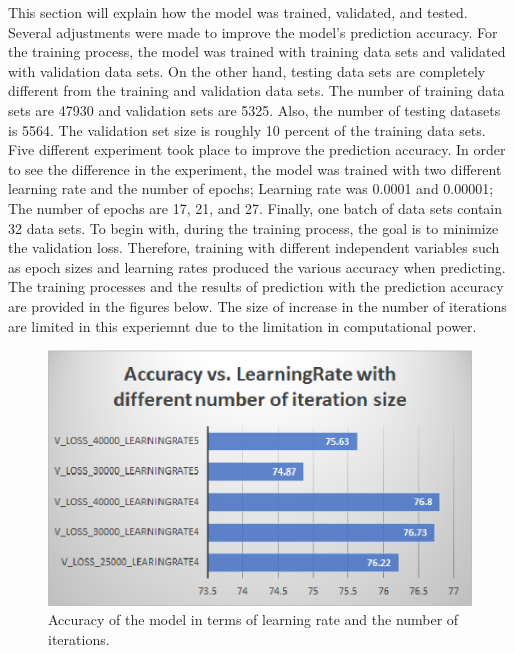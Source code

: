 This section will explain how the model was trained, validated, and tested. Several adjustments were
made to improve the model's prediction accuracy. For the training process, the model was trained with
training data sets and validated with validation data sets. On the other hand, testing data sets are
completely different from the training and validation data sets.
The number of training data sets are 47930 and validation sets are 5325. Also, the number of testing
datasets is 5564. The validation set size is
roughly 10 percent of the training data sets. Five different experiment took place to improve the
prediction accuracy. In order to see the difference in the experiment, the model was trained with two
different learning rate and the number of epochs; Learning rate was 0.0001 and 0.00001; The number of
epochs are 17, 21, and 27. Finally, one batch of data sets contain 32 data sets.
\newline
\newline
\indent
To begin with, during the training process, the goal is to minimize the validation loss. Therefore,
training with different independent variables such as epoch sizes and learning rates produced the various
accuracy when predicting. The training processes and the results of prediction with the prediction accuracy are
provided in the figures below. The size of increase in the number of iterations are limited in this experiemnt
due to the limitation in computational power.
\newline

    \begin{figure}
        \includegraphics[width=\textwidth, scale=0.25]{val_acc.eps}
        \caption{Accuracy of the model in terms of learning rate and the number of iterations.}
        \label{Figure2}
    \end{figure}


